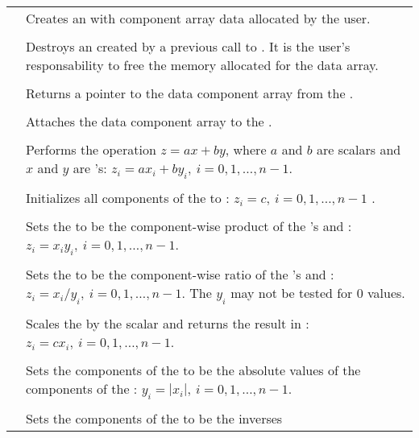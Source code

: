 \begin{supertabular}{|p{\colone}|p{\coltwo}|}
& Creates an  with component array data 
 allocated by the user.
\\
%
 &  \\
& Destroys an  created by a previous call to . 
It is the user's responsability to free the memory allocated for the data array.
\\
%
 &  \\
& Returns a pointer to the data component array from the  .
\\
%
 &  \\
& Attaches the data component array  to the  .
\\
%
 &  \\
& Performs the operation $z = a x + b y$, where $a$ and $b$ are scalars
and $x$ and $y$ are 's:
$z_i = a x_i + b y_i, \: i=0,1,\ldots,n-1$.
\\
%
 &  \\
& Initializes all components of the   to :
$z_i = c,\: i=0,1,\ldots,n-1$ .
\\
%
 &  \\
& Sets the   to be the component-wise product of the
's  and :
$z_i = x_i y_i,\: i=0,1,\ldots,n-1$.
\\
%
 &  \\
& Sets the   to be the component-wise ratio of the
's  and :
$z_i = x_i / y_i,\: i=0,1,\ldots,n-1$. The $y_i$ may not be tested 
for $0$ values.
\\
%
 &  \\
& Scales the   by the scalar  and returns
the result in :
$z_i = c x_i , \: i=0,1,\ldots,n-1$.
\\
%
 &  \\
& Sets the components of the   to be the absolute
values of the components of the  :
$y_i = | x_i | , \: i=0,1,\ldots,n-1$.
\\
%
 &  \\
& Sets the components of the   to be the inverses

\end{supertabular}
